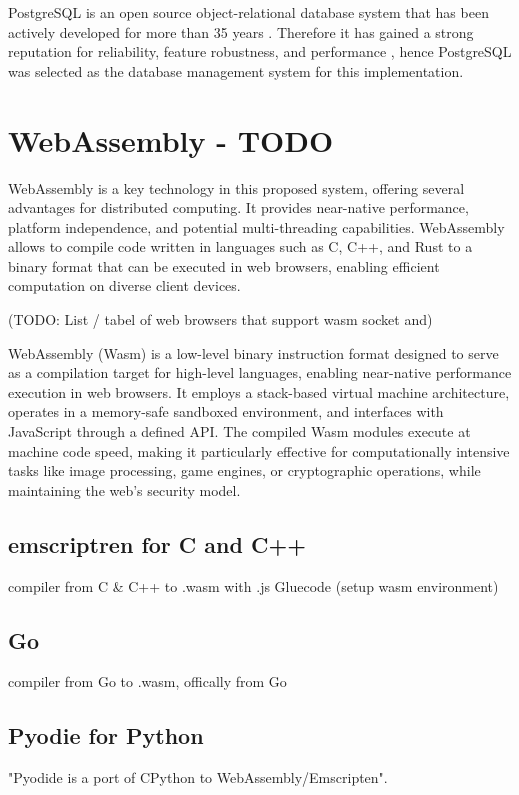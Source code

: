 PostgreSQL is an open source object-relational database system that has been actively developed for more than 35 years \cite{methodology:db}. Therefore it has gained a strong reputation for reliability, feature robustness, and performance \cite{methodology:db}, hence PostgreSQL was selected as the database management system for this implementation.

\section{WebAssembly - TODO}
\label{sec:methodology:wasm}
WebAssembly is a key technology in this proposed system, offering several advantages for distributed computing. It provides near-native performance, platform independence, and potential multi-threading capabilities. WebAssembly allows to compile code written in languages such as C, C++, and Rust to a binary format that can be executed in web browsers, enabling efficient computation on diverse client devices.

(TODO: List / tabel of web browsers that support wasm socket and)

WebAssembly (Wasm) is a low-level binary instruction format designed to serve as a compilation target for high-level languages, enabling near-native performance execution in web browsers. It employs a stack-based virtual machine architecture, operates in a memory-safe sandboxed environment, and interfaces with JavaScript through a defined API. The compiled Wasm modules execute at machine code speed, making it particularly effective for computationally intensive tasks like image processing, game engines, or cryptographic operations, while maintaining the web's security model.

\cite{methodology:wasm, methodology:wasmdocu, relatedwork:wasmedgecomputing}

\subsection{emscriptren for C and C++}
\label{subsec:methodology:wasm:cpp}
compiler from C \& C++ to .wasm with .js Gluecode (setup wasm environment) \cite{methodology:emcc}
\subsection{Go}
\label{subsec:methodology:wasm:go}
compiler from Go to .wasm, offically from Go \cite{methodology:go}
\subsection{Pyodie for Python}
\label{subsec:methodology:wasm:python}
"Pyodide is a port of CPython to WebAssembly/Emscripten". \cite{methodology:pyodie}

